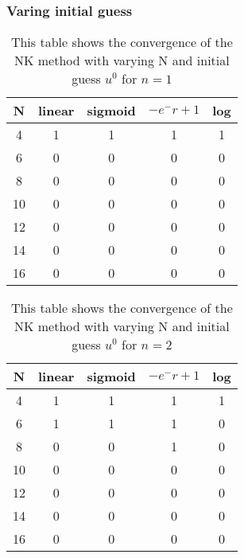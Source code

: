 \documentclass{article}
\begin{document}
\subsubsection{Varing initial guess}
\begin{table}[H]
\centering
\begin{tabular}{|c|c|c|c|c|}
\hline
N                                          & linear  & sigmoid & $-e^-r + 1 $&log \\
\hline
4  & 1 & 1 & 1 & 1\\
6  & 0 & 0 & 0 & 0\\
8  & 0 & 0 & 0 & 0 \\
10 & 0 & 0 & 0 & 0 \\
12 & 0 & 0 & 0 & 0 \\
14 & 0 & 0 & 0 & 0 \\
16 & 0 & 0 & 0 & 0 \\
\hline
\end{tabular}
\caption{This table shows the convergence of the NK method with varying N and initial guess $u^0$ for $n=1$}
\end{table}
\begin{table}[H]
\centering
\begin{tabular}{|c|c|c|c|c|}
\hline
N                                          & linear  & sigmoid & $-e^-r + 1$ &log \\
\hline
4                                          & 1 & 1 & 1 &1\\
6                                          & 1 & 1 & 1 &0\\
8                                          & 0 & 0 & 1 &0\\
10                                         & 0 & 0 & 0 &0\\
12                                         & 0 & 0 & 0 &0\\
14                                         & 0 & 0 & 0 &0\\
16                                         & 0 & 0 & 0 &0\\
\hline
\end{tabular}
\caption{This table shows the convergence of the NK method with varying N and initial guess $u^0$ for $n=2$}
\end{table}
\end{document}
